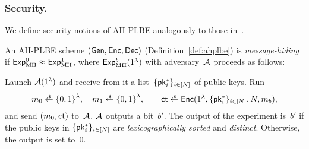 \subsubsection{Security.}
We define security notions of AH-PLBE analogously to those in~\cite{EC:BonSahWat06}.

\begin{definition}\label{def:ahplbe-message-hiding}
An AH-PLBE scheme $({\smash{\mathsf{Gen}}},{\smash{\mathsf{Enc}}},{\smash{\mathsf{Dec}}})$ (Definition~\ref{def:ahplbe})
is \emph{message-hiding} if ${{\smash{\mathsf{Exp}}_{\textup{MH}}^{0}}\approx{\smash{\mathsf{Exp}}_{\textup{MH}}^{1}}}$,
where ${\smash{\mathsf{Exp}}_{\textup{MH}}^{b}}(1^\lambda)$ with adversary~${\mathcal{A}}$ proceeds as follows:
\begin{security}
Launch ${\mathcal{A}}(1^\lambda)$ and
receive from it a list~$\{{\smash{\mathsf{pk}}}_i^\ast\}_{i\in[N]}$ of public keys.
Run
\begin{align*}
m_0\draws\bit^\lambda,\quad
m_1\draws\bit^\lambda,\qquad
\ct\draws\Enc(1^\lambda,\{\pk_i^\ast\}_{i\in[N]},N,m_b),
\end{align*}
and send $(m_0,{\smash{\mathsf{ct}}})$ to~${\mathcal{A}}$.
${\mathcal{A}}$ outputs a bit~$b'$.
The output of the experiment is~$b'$
if the public keys in $\{{\smash{\mathsf{pk}}}_i^\ast\}_{i\in[N]}$ are \emph{lexicographically sorted} and \emph{distinct}.
Otherwise, the output is set to~$0$.
\end{security}
\end{definition}

